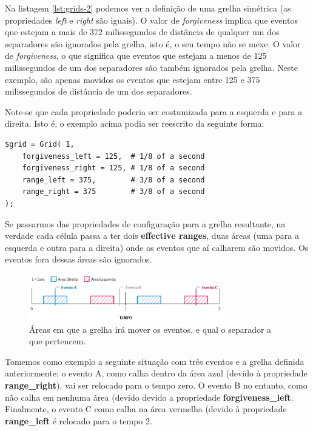 Na listagem \ref{lst:grids-2} podemos ver a definição de uma grelha simétrica (as propriedades \textit{left} e \textit{right} são iguais). O valor de \textit{forgiveness} implica que eventos que estejam a mais de 372 milissegundos de distância de qualquer um dos separadores são ignorados pela grelha, isto é, o seu tempo não se mexe. O valor de \textit{forgiveness}, o que significa que eventos que estejam a menos de 125 milissegundos de um dos separadores são também ignorados pela grelha. Neste exemplo, são apenas movidos os eventos que estejam entre 125 e 375 milissegundos de distância de um dos separadores.

Note-se que cada propriedade poderia ser costumizada para a esquerda e para a direita. Isto é, o exemplo acima podia ser reescrito da seguinte forma:

\begin{lstlisting}[caption={Código alternativo de definição da grelha representada na figura \ref{fig:grids-2}, com as propriedades \textit{left} e \textit{right}},label={lst:grids-3}]
$grid = Grid( 1,
    forgiveness_left = 125,  # 1/8 of a second
    forgiveness_right = 125, # 1/8 of a second
    range_left = 375,        # 3/8 of a second
    range_right = 375        # 3/8 of a second
);
\end{lstlisting}

Se passarmos das propriedades de configuração para a grelha resultante, na verdade cada célula passa a ter dois \textbf{effective ranges}, duas áreas (uma para a esquerda e outra para a direita) onde os eventos que aí calharem são movidos. Os eventos fora dessas áreas são ignorados.

\begin{figure}[h]
\begin{center}
    \includegraphics[width=0.75\textwidth]{img/grids_3_1.png}
\end{center}
\vspace*{-5mm}
\caption{Áreas em que a grelha irá mover os eventos, e qual o separador a que pertencem.}
\label{fig:grids-3-1}
\end{figure}

Tomemos como exemplo a seguinte situação com três eventos e a grelha definida anteriormente: o evento A, como calha dentro da área azul (devido à propriedade \textbf{range\_right}), vai ser relocado para o tempo zero. O evento B no entanto, como não calha em nenhuma área (devido devido a propriedade \textbf{forgiveness\_left}. Finalmente, o evento C como calha na área vermelha (devido à propriedade \textbf{range\_left} é relocado para o tempo 2.

